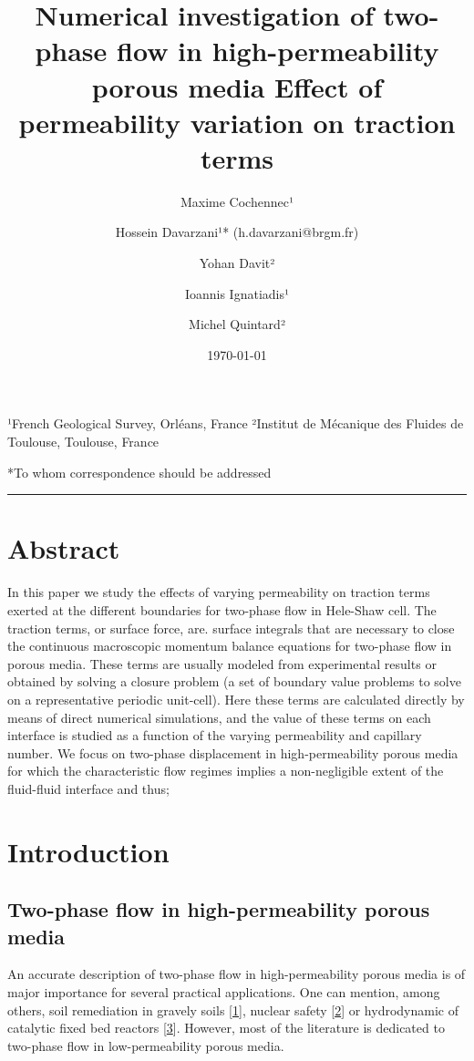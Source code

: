 \documentclass[]{article}
\title{Numerical investigation of two-phase flow in high-permeability porous
media Effect of permeability variation on traction terms}
\author{Maxime Cochennec¹ \and Hossein Davarzani¹* (h.davarzani@brgm.fr) \and Yohan Davit² \and Ioannis Ignatiadis¹ \and Michel Quintard²}
\date{\today{}}
\begin{document}
\maketitle

¹French Geological Survey, Orléans, France ²Institut de Mécanique des
Fluides de Toulouse, Toulouse, France

*To whom correspondence should be addressed

\begin{center}\rule{0.5\linewidth}{\linethickness}\end{center}

\hypertarget{abstract}{%
\section{Abstract}\label{abstract}}

In this paper we study the effects of varying permeability on traction
terms exerted at the different boundaries for two-phase flow in
Hele-Shaw cell. The traction terms, or surface force, are. surface
integrals that are necessary to close the continuous macroscopic
momentum balance equations for two-phase flow in porous media. These
terms are usually modeled from experimental results or obtained by
solving a closure problem (a set of boundary value problems to solve on
a representative periodic unit-cell). Here these terms are calculated
directly by means of direct numerical simulations, and the value of
these terms on each interface is studied as a function of the varying
permeability and capillary number. We focus on two-phase displacement in
high-permeability porous media for which the characteristic flow regimes
implies a non-negligible extent of the fluid-fluid interface and thus;

\hypertarget{introduction}{%
\section{Introduction}\label{introduction}}

\hypertarget{two-phase-flow-in-high-permeability-porous-media}{%
\subsection{Two-phase flow in high-permeability porous
media}\label{two-phase-flow-in-high-permeability-porous-media}}

An accurate description of two-phase flow in high-permeability porous
media is of major importance for several practical applications. One can
mention, among others, soil remediation in gravely soils
{[}\protect\hyperlink{ref-fetter2017contaminant}{1}{]}, nuclear safety
{[}\protect\hyperlink{ref-clavier2017modeling}{2}{]} or hydrodynamic of
catalytic fixed bed reactors
{[}\protect\hyperlink{ref-Santos1991}{3}{]}. However, most of the
literature is dedicated to two-phase flow in low-permeability porous
media.
\end{document}
